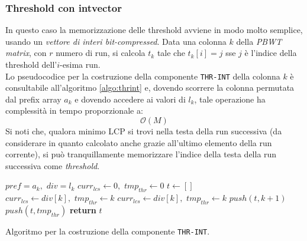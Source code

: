 \subsubsection{Threshold con intvector}
In questo caso la memorizzazione delle threshold avviene in modo molto semplice,
usando un \textit{vettore di interi bit-compressed}. Data una colonna $k$ della
\textit{PBWT matrix}, con $r$ numero di run, si calcola $t_k$ tale che
$t_k[i]=j$ sse $j$ è l'indice della threshold dell'$i$-esima run.\\
Lo pseudocodice per la costruzione della componente
\texttt{THR-INT} della colonna $k$ è consultabile all'algoritmo
\ref{algo:thrint} 
e, dovendo scorrere la colonna permutata dal prefix array $a_k$ e dovendo
accedere ai valori di $l_k$, tale operazione ha complessità in tempo
proporzionale a:
\begin{equation}
  \label{eq:thrint}
  \mathcal{O}(M)
\end{equation}
Si noti che, qualora minimo LCP si trovi nella testa della run successiva (da
considerare in quanto calcolato anche grazie all'ultimo elemento della run
corrente), si può tranquillamente memorizzare l'indice della testa della run
successiva come \textit{threshold}.
\begin{algorithm}
  \begin{algorithmic}
    \Comment $pref=a_k,\,\,div=l_k$
    \State $curr_{lcs}\gets 0,\,\,tmp_{thr}\gets 0$
    \State $t\gets[]$
    \For {\textit{every} $k\in\left[0,\,\, M\right)$}
    \State $curr_{lcs}\gets div[k],\,\,tmp_{thr}\gets k$
    \EndIf
    \State $curr_{lcs}\gets div[k],\,\,tmp_{thr}\gets k$
    \EndIf
    \State $push(t, k+1)$
    \Else 
    \State $push(t, tmp_{thr})$
    \EndIf
    \EndIf
    \EndFor
    \State \textbf{return} $t$  
    \EndFunction
  \end{algorithmic}
  \caption{Algoritmo per la costruzione della componente \texttt{THR-INT}.}
  \label{algo:thrint}
\end{algorithm}
